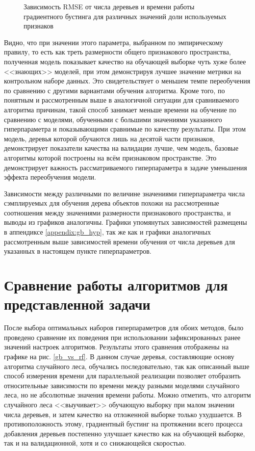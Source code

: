\documentclass[a4paper, 14pt]{article}
\begin{document}
    \begin{figure}[H]
      \centering
      
      \caption{Зависимость RMSE от числа деревьев и времени работы градиентного бустинга для различных значений доли используемых признаков}\label{boosting_fss}
    \end{figure}
    
    Видно, что при значении этого параметра, выбранном по эмпирическому правилу, то есть как треть размерности общего признакового пространства, полученная модель показывает качество на обучающей выборке чуть хуже более <<знающих>> моделей, при этом демонстрируя лучшее значение метрики на контрольном наборе данных. Это свидетельствует о меньшем темпе переобучения по сравнению с другими вариантами обучения алгоритма. Кроме того, по понятным и рассмотренным выше в аналогичной ситуации для сравниваемого алгоритма причинам, такой способ занимает меньше времени на обучение по сравнению с моделями, обученными с большими значениями указанного гиперпараметра и показывающими сравнимые по качеству результаты. При этом модель, деревья которой обучаются лишь на десятой части признаков, демонстрирует показатели качества на валидации лучше, чем модель, базовые алгоритмы которой построены на всём признаковом пространстве. Это демонстрирует важность рассматриваемого гиперпараметра в задаче уменьшения эффекта переобучения модели.

    Зависимости между различными по величине значениями гиперпараметра числа сэмплируемых для обучения дерева объектов похожи на рассмотренные соотношения между значениями размерности признакового пространства, и выводы из графиков аналогичны. Графики упомянутых зависимостей размещены в аппендиксе \ref{appendix:gb_hyp}, так же как и графики аналогичных рассмотренным выше зависимостей времени обучения от числа деревьев для указанных в настоящем пункте гиперпараметров.

\section{Сравнение работы алгоритмов для представленной задачи}
    После выбора оптимальных наборов гиперпараметров для обоих методов, было проведено сравнение их поведения при использовании зафиксированных ранее значений настроек алгоритмов. Результаты этого сравнения отображены на графике на рис. \ref{gb_vs_rf}. В данном случае деревья, составляющие основу алгоритма случайного леса, обучались последовательно, так как описанный выше способ измерения времени для параллельной реализации позволяет отобразить относительные зависимости по времени между разными моделями случайного леса, но не абсолютные значения времени работы. Можно отметить, что алгоритм случайного леса <<выучивает>> обучающую выборку при малом значении числа деревьев, и затем качество на отложенной выборке только ухудшается. В противоположность этому, градиентный бустинг на протяжении всего процесса добавления деревьев постепенно улучшает качество как на обучающей выборке, так и на валидационной, хотя и со снижающейся скоростью.
\end{document}
